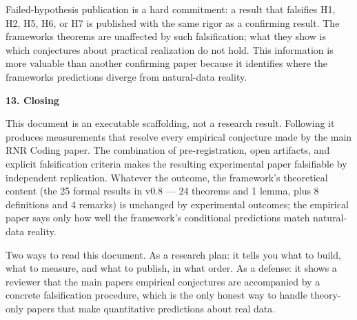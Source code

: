 \documentclass[
]{article}
\begin{document}
Failed-hypothesis publication is a hard commitment: a result that
falsifies H1, H2, H5, H6, or H7 is published with the same rigor as a
confirming result. The framework\textquotesingle s theorems are
unaffected by such falsification; what they show is which conjectures
about practical realization do not hold. This information is more
valuable than another confirming paper because it identifies where the
framework\textquotesingle s predictions diverge from natural-data
reality.

\textbf{13. Closing}

This document is an executable scaffolding, not a research result.
Following it produces measurements that resolve every empirical
conjecture made by the main RNR Coding paper. The combination of
pre-registration, open artifacts, and explicit falsification criteria
makes the resulting experimental paper falsifiable by independent
replication. Whatever the outcome, the framework's theoretical content (the 25
formal results in v0.8 --- 24 theorems and 1 lemma, plus 8 definitions
and 4 remarks) is unchanged by experimental
outcomes; the empirical paper says only how well the framework's
conditional predictions match natural-data reality.

Two ways to read this document. As a research plan: it tells you what to
build, what to measure, and what to publish, in what order. As a
defense: it shows a reviewer that the main paper\textquotesingle s
empirical conjectures are accompanied by a concrete falsification
procedure, which is the only honest way to handle theory-only papers
that make quantitative predictions about real data.
\end{document}
